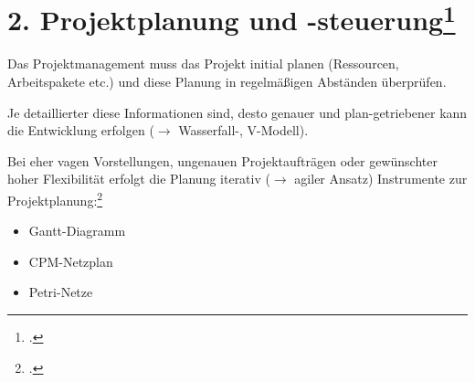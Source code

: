 \documentclass{bschlangaul-theorie}
\begin{document}
\section{2. Projektplanung und -steuerung\footcite[Seite 19]{sosy:fs:1}}

Das Projektmanagement muss das Projekt initial planen (Ressourcen,
Arbeitspakete etc.) und diese Planung in regelmäßigen Abständen
überprüfen.

Je detaillierter diese Informationen sind, desto genauer und
plan-getriebener kann die Entwicklung erfolgen ($\rightarrow$
Wasserfall-, V-Modell).

Bei eher vagen Vorstellungen, ungenauen Projektaufträgen oder
gewünschter hoher Flexibilität erfolgt die Planung iterativ
($\rightarrow$ agiler Ansatz) Instrumente zur
Projektplanung:\footcite[Seite 25-27]{schatten}

\begin{itemize}
\item Gantt-Diagramm
\item CPM-Netzplan
\item Petri-Netze
\end{itemize}

\literatur
\end{document}
